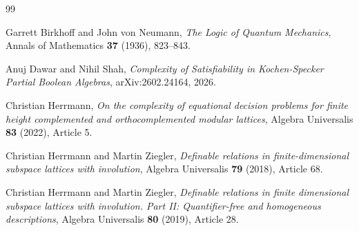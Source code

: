 \documentclass[11pt]{article}
\theoremstyle{plain}
\theoremstyle{definition}
\begin{document}
\begin{thebibliography}{99}

Garrett Birkhoff and John von Neumann,
\emph{The Logic of Quantum Mechanics},
Annals of Mathematics \textbf{37} (1936), 823--843.

Anuj Dawar and Nihil Shah,
\emph{Complexity of Satisfiability in Kochen-Specker Partial Boolean Algebras},
arXiv:2602.24164, 2026.

Christian Herrmann,
\emph{On the complexity of equational decision problems for finite height complemented and orthocomplemented modular lattices},
Algebra Universalis \textbf{83} (2022), Article 5.

Christian Herrmann and Martin Ziegler,
\emph{Definable relations in finite-dimensional subspace lattices with involution},
Algebra Universalis \textbf{79} (2018), Article 68.

Christian Herrmann and Martin Ziegler,
\emph{Definable relations in finite dimensional subspace lattices with involution. Part II: Quantifier-free and homogeneous descriptions},
Algebra Universalis \textbf{80} (2019), Article 28.

\end{thebibliography}
\end{document}

